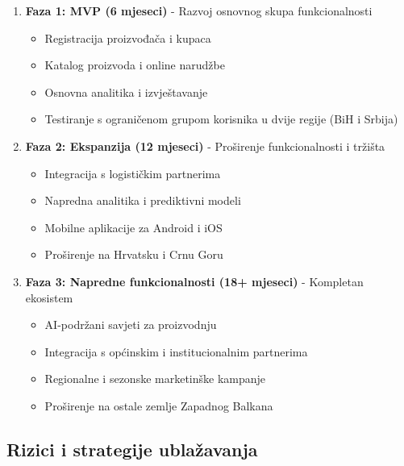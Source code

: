 \documentclass[a4paper,12pt]{article}
\begin{document}
\begin{enumerate}
    \item \textbf{Faza 1: MVP (6 mjeseci)} - Razvoj osnovnog skupa funkcionalnosti 
    \begin{itemize}
        \item Registracija proizvođača i kupaca
        \item Katalog proizvoda i online narudžbe
        \item Osnovna analitika i izvještavanje
        \item Testiranje s ograničenom grupom korisnika u dvije regije (BiH i Srbija)
    \end{itemize}
    
    \item \textbf{Faza 2: Ekspanzija (12 mjeseci)} - Proširenje funkcionalnosti i tržišta
    \begin{itemize}
        \item Integracija s logističkim partnerima
        \item Napredna analitika i prediktivni modeli
        \item Mobilne aplikacije za Android i iOS
        \item Proširenje na Hrvatsku i Crnu Goru
    \end{itemize}
    
    \item \textbf{Faza 3: Napredne funkcionalnosti (18+ mjeseci)} - Kompletan ekosistem
    \begin{itemize}
        \item AI-podržani savjeti za proizvodnju
        \item Integracija s općinskim i institucionalnim partnerima
        \item Regionalne i sezonske marketinške kampanje
        \item Proširenje na ostale zemlje Zapadnog Balkana
    \end{itemize}
\end{enumerate}

\subsection{Rizici i strategije ublažavanja}
\end{document}
